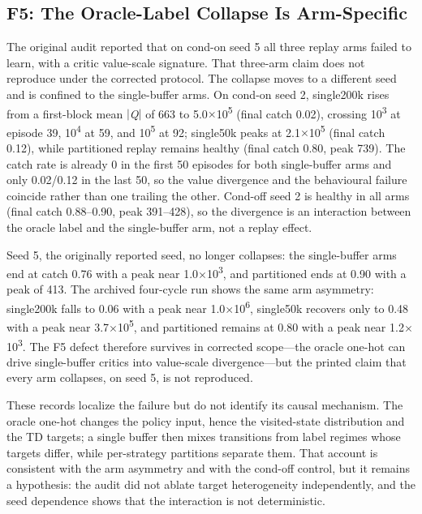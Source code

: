 \documentclass[conference,9pt]{IEEEtran}
\begin{document}
\subsection{F5: The Oracle-Label Collapse Is Arm-Specific}

The original audit reported that on cond-on seed 5 all three replay arms failed to learn, with a critic value-scale signature. That three-arm claim does not reproduce under the corrected protocol. The collapse moves to a different seed and is confined to the single-buffer arms. On cond-on seed 2, single200k rises from a first-block mean $|$\textit{Q}$|$ of 663 to 5.0$\times$10\textsuperscript{5} (final catch 0.02), crossing 10\textsuperscript{3} at episode 39, 10\textsuperscript{4} at 59, and 10\textsuperscript{5} at 92; single50k peaks at 2.1$\times$10\textsuperscript{5} (final catch 0.12), while partitioned replay remains healthy (final catch 0.80, peak 739). The catch rate is already 0 in the first 50 episodes for both single-buffer arms and only 0.02/0.12 in the last 50, so the value divergence and the behavioural failure coincide rather than one trailing the other. Cond-off seed 2 is healthy in all arms (final catch 0.88--0.90, peak 391--428), so the divergence is an interaction between the oracle label and the single-buffer arm, not a replay effect.

Seed 5, the originally reported seed, no longer collapses: the single-buffer arms end at catch 0.76 with a peak near 1.0$\times$10\textsuperscript{3}, and partitioned ends at 0.90 with a peak of 413. The archived four-cycle run shows the same arm asymmetry: single200k falls to 0.06 with a peak near 1.0$\times$10\textsuperscript{6}, single50k recovers only to 0.48 with a peak near 3.7$\times$10\textsuperscript{5}, and partitioned remains at 0.80 with a peak near 1.2$\times$10\textsuperscript{3}. The F5 defect therefore survives in corrected scope---the oracle one-hot can drive single-buffer critics into value-scale divergence---but the printed claim that every arm collapses, on seed 5, is not reproduced.

These records localize the failure but do not identify its causal mechanism. The oracle one-hot changes the policy input, hence the visited-state distribution and the TD targets; a single buffer then mixes transitions from label regimes whose targets differ, while per-strategy partitions separate them. That account is consistent with the arm asymmetry and with the cond-off control, but it remains a hypothesis: the audit did not ablate target heterogeneity independently, and the seed dependence shows that the interaction is not deterministic.
\end{document}
